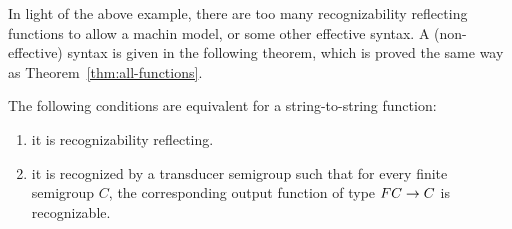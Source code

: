 In light of the above example, there are too many recognizability reflecting functions to allow a machin model, or some other effective syntax. A (non-effective) syntax is given in the following theorem, which is proved the same way as Theorem~\ref{thm:all-functions}.

\begin{theorem}\label{thm:reco-reflecting-functions} The following conditions are equivalent for a string-to-string function:
    \begin{enumerate}
        \item \label{it:reco-refl} it is recognizability reflecting.
        \item \label{it:trans-semig-reco}it is recognized by a transducer semigroup  such that for every finite semigroup $C$, the corresponding output function of type  
        $\functor C \to C$
        is recognizable.
    \end{enumerate}
\end{theorem}
